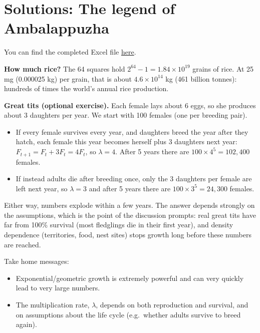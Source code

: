 \documentclass[
  a4paper]{book}
\providecommand{\tightlist}{%
  \setlength{\itemsep}{0pt}\setlength{\parskip}{0pt}}
\begin{document}
\section{Solutions: The legend of Ambalappuzha}\label{solutions-the-legend-of-ambalappuzha}

You can find the completed Excel file \href{https://www.dropbox.com/s/ybe5qhmfltuhoyv/RiceOnAChessboard_completed.xlsx?dl=1}{here}.

\textbf{How much rice?} The 64 squares hold \(2^{64} - 1 = 1.84 \times 10^{19}\) grains of rice. At 25 mg (0.000025 kg) per grain, that is about \(4.6 \times 10^{14}\) kg (461 billion tonnes): hundreds of times the world's annual rice production.

\textbf{Great tits (optional exercise).} Each female lays about 6 eggs, so she produces about 3 daughters per year. We start with 100 females (one per breeding pair).

\begin{itemize}
\tightlist
\item
  If every female survives every year, and daughters breed the year after they hatch, each female this year becomes herself plus 3 daughters next year: \(F_{t+1} = F_t + 3F_t = 4F_t\), so \(\lambda = 4\). After 5 years there are \(100 \times 4^5 = 102{,}400\) females.
\item
  If instead adults die after breeding once, only the 3 daughters per female are left next year, so \(\lambda = 3\) and after 5 years there are \(100 \times 3^5 = 24{,}300\) females.
\end{itemize}

Either way, numbers explode within a few years. The answer depends strongly on the assumptions, which is the point of the discussion prompts: real great tits have far from 100\% survival (most fledglings die in their first year), and density dependence (territories, food, nest sites) stops growth long before these numbers are reached.

Take home messages:

\begin{itemize}
\tightlist
\item
  Exponential/geometric growth is extremely powerful and can very quickly lead to very large numbers.
\item
  The multiplication rate, \(\lambda\), depends on both reproduction and survival, and on assumptions about the life cycle (e.g.~whether adults survive to breed again).
\end{itemize}
\end{document}
